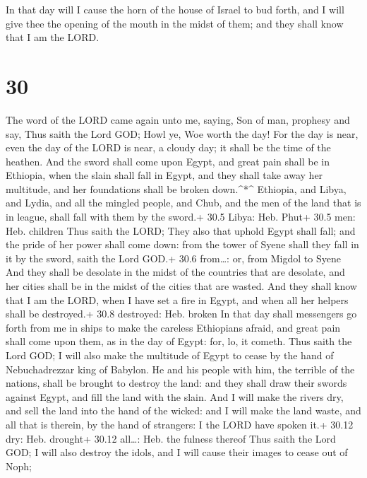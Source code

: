  In that day will I cause the horn of the house of Israel
to bud forth, and I will give thee the opening of the mouth in the midst
of them; and they shall know that I am the LORD.

\hypertarget{section-29}{%
\section{30}\label{section-29}}

 The word of the LORD came again unto me, saying,
 Son of man, prophesy and say, Thus saith the Lord GOD; Howl
ye, Woe worth the day!  For the day is near, even the day of
the LORD is near, a cloudy day; it shall be the time of the heathen.
 And the sword shall come upon Egypt, and great pain shall
be in Ethiopia, when the slain shall fall in Egypt, and they shall take
away her multitude, and her foundations shall be broken down.\^{}*\^{}
 Ethiopia, and Libya, and Lydia, and all the mingled people,
and Chub, and the men of the land that is in league, shall fall with
them by the sword.+ 30.5 Libya: Heb. Phut+ 30.5 men: Heb. children
 Thus saith the LORD; They also that uphold Egypt shall
fall; and the pride of her power shall come down: from the tower of
Syene shall they fall in it by the sword, saith the Lord GOD.+ 30.6
from\ldots: or, from Migdol to Syene  And they shall be
desolate in the midst of the countries that are desolate, and her cities
shall be in the midst of the cities that are wasted.  And
they shall know that I am the LORD, when I have set a fire in Egypt, and
when all her helpers shall be destroyed.+ 30.8 destroyed: Heb. broken
 In that day shall messengers go forth from me in ships to
make the careless Ethiopians afraid, and great pain shall come upon
them, as in the day of Egypt: for, lo, it cometh.  Thus
saith the Lord GOD; I will also make the multitude of Egypt to cease by
the hand of Nebuchadrezzar king of Babylon.  He and his
people with him, the terrible of the nations, shall be brought to
destroy the land: and they shall draw their swords against Egypt, and
fill the land with the slain.  And I will make the rivers
dry, and sell the land into the hand of the wicked: and I will make the
land waste, and all that is therein, by the hand of strangers: I the
LORD have spoken it.+ 30.12 dry: Heb. drought+ 30.12 all\ldots: Heb. the
fulness thereof  Thus saith the Lord GOD; I will also
destroy the idols, and I will cause their images to cease out of Noph;
